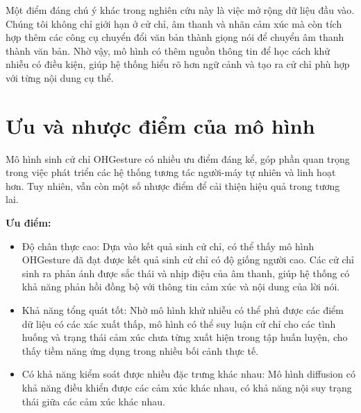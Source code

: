 Một điểm đáng chú ý khác trong nghiên cứu này là việc mở rộng dữ liệu đầu vào. Chúng tôi không chỉ giới hạn ở cử chỉ, âm thanh và nhãn cảm xúc mà còn tích hợp thêm các công cụ chuyển đổi văn bản thành giọng nói để chuyển âm thanh thành văn bản. Nhờ vậy, mô hình có thêm nguồn thông tin để học cách khử nhiễu có điều kiện, giúp hệ thống hiểu rõ hơn ngữ cảnh và tạo ra cử chỉ phù hợp với từng nội dung cụ thể.




\section{Ưu và nhược điểm của mô hình}


Mô hình sinh cử chỉ OHGesture có nhiều ưu điểm đáng kể, góp phần quan trọng trong việc phát triển các hệ thống tương tác người-máy tự nhiên và linh hoạt hơn. Tuy nhiên, vẫn còn một số nhược điểm để cải thiện hiệu quả trong tương lai.

\textbf{Ưu điểm:}

\begin{itemize}
	\item Độ chân thực cao: Dựa vào kết quả sinh cử chỉ, có thể thấy mô hình OHGesture đã đạt được kết quả sinh cử chỉ có độ giống người cao. Các cử chỉ sinh ra phản ánh được sắc thái và nhịp điệu của âm thanh, giúp hệ thống có khả năng phản hồi đồng bộ với thông tin cảm xúc và nội dung của lời nói.
	
	\item Khả năng tổng quát tốt: Nhờ mô hình khử nhiễu có thể phủ được các điểm dữ liệu có các xác xuất thấp, mô hình có thể suy luận cử chỉ cho các tình huống và trạng thái cảm xúc chưa từng xuất hiện trong tập huấn luyện, cho thấy tiềm năng ứng dụng trong nhiều bối cảnh thực tế.
	
	\item Có khả năng kiểm soát được nhiều đặc trưng khác nhau: Mô hình diffusion có khả năng điều khiển được các cảm xúc khác nhau, có khả năng nội suy trạng thái giữa các cảm xúc khác nhau.
	
	
	
	\end{itemize}



